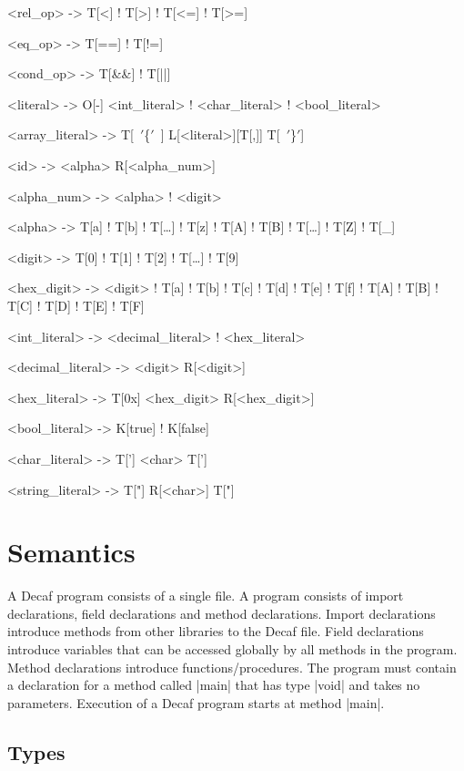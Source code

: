 \documentclass[11pt]{article}
\gdef\kw#1{{\bnf K[#1]}}
\gdef\term#1{{\bnf T[#1]}}
\begin{document}
\begin{bnfgrammar}
<rel_op> -> T[<] ! T[>] ! T[<=] ! T[>=]

<eq_op>   -> T[==] ! T[!=]

<cond_op> -> T[\&\&] ! T[||]

<literal> -> O[-] <int_literal> ! <char_literal> ! <bool_literal>

<array_literal> -> T[~$'$\{$'$~] L[<literal>][T[,]] T[~$'$\}$'$]

<id> -> <alpha> R[<alpha_num>]

<alpha_num> -> <alpha> ! <digit>

<alpha> -> T[a] ! T[b] ! T[\ldots{}] ! T[z] ! T[A] ! T[B] ! T[\ldots{}] ! T[Z] ! T[\_]

<digit> -> T[0] ! T[1] ! T[2] ! T[\ldots] ! T[9]

<hex_digit> -> <digit> ! T[a] ! T[b] ! T[c] ! T[d] ! T[e] ! T[f] ! T[A] ! T[B] ! T[C] ! T[D] ! T[E] ! T[F]

<int_literal> -> <decimal_literal> ! <hex_literal>

<decimal_literal> -> <digit> R[<digit>]

<hex_literal> -> T[0x] <hex_digit> R[<hex_digit>]

<bool_literal> -> K[true] ! K[false]

<char_literal> -> T['] <char> T[']

<string_literal> -> T["] R[<char>] T["]
\end{bnfgrammar}


\section{Semantics}
\def\arrayint{\kw{array}\term{\[\kw{int}\]}}
\def\arraybool{\kw{array}\term{\[\kw{bool}\]}}
\def\arrayT{\kw{array}\term{\[T\]}}

A Decaf program consists of a single file.
A program consists of import declarations, field declarations and method declarations.
Import declarations introduce methods from other libraries to the Decaf file.
Field declarations introduce variables that can be accessed globally by all methods in the program.
Method declarations introduce functions/procedures.
The program must contain a declaration for a method called \decaf|main| that has type \decaf|void| and takes no parameters.
Execution of a Decaf program starts at method \decaf|main|.

\subsection{Types}
\end{document}
